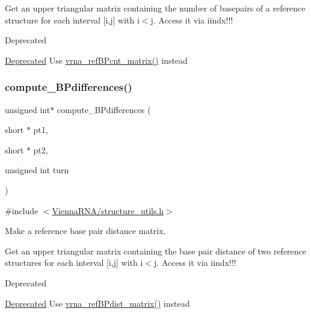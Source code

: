 Get an upper triangular matrix containing the number of basepairs of a reference structure for each interval \mbox{[}i,j\mbox{]} with i$<$j. Access it via iindx!!!

\begin{DoxyRefDesc}{Deprecated}
\item[\hyperlink{deprecated__deprecated000145}{Deprecated}]Use \hyperlink{group__struct__utils_gab4c2a00c99ce1d612ffa5bde114eb96d}{vrna\+\_\+ref\+B\+Pcnt\+\_\+matrix()} instead \end{DoxyRefDesc}
\mbox{\label{group__struct__utils_gadd463184355d0803b6ee6e09f29182f2}} 
\subsubsection{\texorpdfstring{compute\+\_\+\+B\+Pdifferences()}{compute\_BPdifferences()}}
{\footnotesize\ttfamily unsigned int$\ast$ compute\+\_\+\+B\+Pdifferences (\begin{DoxyParamCaption}\item[{short $\ast$}]{pt1,  }\item[{short $\ast$}]{pt2,  }\item[{unsigned int}]{turn }\end{DoxyParamCaption})}



{\ttfamily \#include $<$\hyperlink{structure__utils_8h}{Vienna\+R\+N\+A/structure\+\_\+utils.\+h}$>$}



Make a reference base pair distance matrix. 

Get an upper triangular matrix containing the base pair distance of two reference structures for each interval \mbox{[}i,j\mbox{]} with i$<$j. Access it via iindx!!!

\begin{DoxyRefDesc}{Deprecated}
\item[\hyperlink{deprecated__deprecated000146}{Deprecated}]Use \hyperlink{group__struct__utils_ga5a27bd058183170afd4716f5b8ff511a}{vrna\+\_\+ref\+B\+Pdist\+\_\+matrix()} instead \end{DoxyRefDesc}
\mbox{\label{group__struct__utils_gadf0ad2d46c9ca7b850437d1b79627a7e}} 
